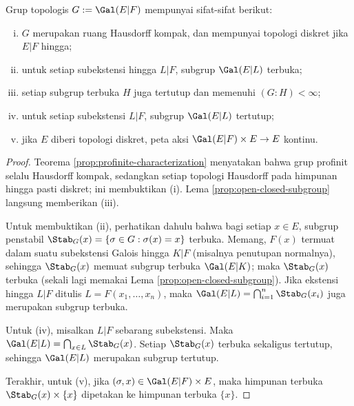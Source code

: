\begin{lemma}\label{prop:Krull-top-properties}
	Grup topologis $G:=\Gal(E|F)$ mempunyai sifat-sifat berikut:
	\begin{enumerate}[(i)]
		\item $G$ merupakan ruang Hausdorff kompak, dan mempunyai topologi diskret jika $E|F$ hingga;
		\item untuk setiap subekstensi hingga $L|F$, subgrup $\Gal(E|L)$ terbuka;
		\item setiap subgrup terbuka $H$ juga tertutup dan memenuhi $(G:H)<\infty$;
		\item untuk setiap subekstensi $L|F$, subgrup $\Gal(E|L)$ tertutup;
		\item jika $E$ diberi topologi diskret, peta aksi $\Gal(E|F)\times E\to E$ kontinu.
	\end{enumerate}
\end{lemma}
\begin{proof}
	Teorema \ref{prop:profinite-characterization} menyatakan bahwa grup profinit selalu Hausdorff kompak, sedangkan setiap topologi Hausdorff pada himpunan hingga pasti diskret; ini membuktikan (i). Lema \ref{prop:open-closed-subgroup} langsung memberikan (iii).
	
	Untuk membuktikan (ii), perhatikan dahulu bahwa bagi setiap $x\in E$, subgrup penstabil $\Stab_G(x)=\{\sigma\in G:\sigma(x)=x\}$ terbuka. Memang, $F(x)$ termuat dalam suatu subekstensi Galois hingga $K|F$ (misalnya penutupan normalnya), sehingga $\Stab_G(x)$ memuat subgrup terbuka $\Gal(E|K)$; maka $\Stab_G(x)$ terbuka (sekali lagi memakai Lema \ref{prop:open-closed-subgroup}). Jika ekstensi hingga $L|F$ ditulis $L=F(x_1,\ldots,x_n)$, maka $\Gal(E|L)=\bigcap_{i=1}^n\Stab_G(x_i)$ juga merupakan subgrup terbuka.
	
	Untuk (iv), misalkan $L|F$ sebarang subekstensi. Maka $\Gal(E|L)=\bigcap_{x\in L}\Stab_G(x)$. Setiap $\Stab_G(x)$ terbuka sekaligus tertutup, sehingga $\Gal(E|L)$ merupakan subgrup tertutup.
	
	Terakhir, untuk (v), jika $(\sigma,x)\in\Gal(E|F)\times E$, maka himpunan terbuka $\Stab_G(x)\times\{x\}$ dipetakan ke himpunan terbuka $\{x\}$.
\end{proof}

